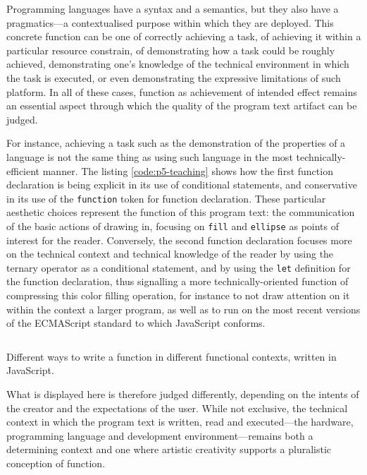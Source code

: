 Programming languages have a syntax and a semantics, but they also have a pragmatics—a contextualised purpose within which they are deployed. This concrete function can be one of correctly achieving a task, of achieving it within a particular resource constrain, of demonstrating how a task could be roughly achieved, demonstrating one's knowledge of the technical environment in which the task is executed, or even demonstrating the expressive limitations of such platform. In all of these cases, function as achievement of intended effect remains an essential aspect through which the quality of the program text artifact can be judged.

For instance, achieving a task such as the demonstration of the properties of a language is not the same thing as using such language in the most technically-efficient manner. The listing \ref{code:p5-teaching} shows how the first function declaration is being explicit in its use of conditional statements, and conservative in its use of the \lstinline{function} token for function declaration. These particular aesthetic choices represent the function of this program text: the communication of the basic actions of drawing in, focusing on \lstinline{fill} and \lstinline{ellipse} as points of interest for the reader. Conversely, the second function declaration focuses more on the technical context and technical knowledge of the reader by using the ternary operator as a conditional statement, and by using the \lstinline{let} definition for the function declaration, thus signalling a more technically-oriented function of compressing this color filling operation, for instance to not draw attention on it within the context a larger program, as well as to run on the most recent versions of the ECMAScript standard to which JavaScript conforms.

\begin{listing}
  \inputminted{text}{./corpus/p5.js}
  \caption{Different ways to write a function in different functional contexts, written in JavaScript.}
  \label{code:p5-teaching}
\end{listing}

What is displayed here is therefore judged differently, depending on the intents of the creator and the expectations of the user. While not exclusive, the technical context in which the program text is written, read and executed—the hardware, programming language and development environment—remains both a determining context and one where artistic creativity supports a pluralistic conception of function.

